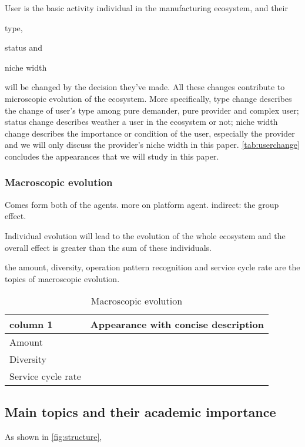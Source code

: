 User is the basic activity individual in the manufacturing ecosystem, and their \begin{inparaenum}[1)]
\item type,
\item status and 
\item niche width
\end{inparaenum} will be changed by the decision they've made. 
All these changes contribute to microscopic evolution of the ecosystem. More specifically, type change describes the change of user's type among pure demander, pure provider and complex user; status change describes weather a user in the ecosystem or not; niche width change describes the importance or condition of the user, especially the provider and we will only discuss the provider's niche width in this paper. \autoref{tab:userchange} concludes the appearances that we will study in this paper.

\subsubsection{Macroscopic evolution} %
\label{ssub:macroscopic_evolution}
Comes form both of the agents. more on platform agent.
indirect: the group effect.

Individual evolution will lead to the evolution of the whole ecosystem and the overall effect is greater than the sum of these individuals.

the amount, diversity, operation pattern recognition and service cycle rate are the topics of macroscopic evolution.

\begin{table}[htbp]
 	\caption{Macroscopic evolution}
 	\label{tab:macroevolution}
 	\centering
 	\scriptsize
 	\begin{tabularx}{\textwidth}{llX}
 	\toprule
 	\textbf{column 1} & \multicolumn{2}{l}{\textbf{Appearance with concise description}} \\
 	\midrule
 	Amount & & \\
 	Diversity & & \\
 	Service cycle rate & & \\
 	\bottomrule
 	\end{tabularx}
 \end{table} 



\subsection{Main topics and their academic importance}
As shown in \autoref{fig:structure},

